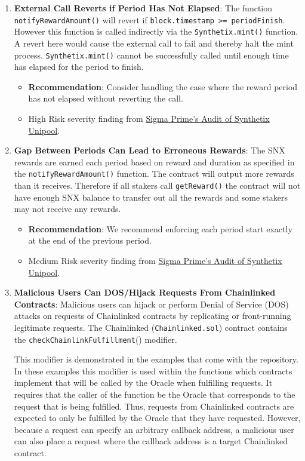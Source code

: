\begin{enumerate}
\item\textbf{External Call Reverts if Period Has Not Elapsed}: The function \verb|notifyRewardAmount()| will revert if \verb|block.timestamp >= periodFinish|. However this function is called indirectly via the \verb|Synthetix.mint()| function. A revert here would cause the external call to fail and thereby halt the mint process. \verb|Synthetix.mint()| cannot be successfully called until enough time has elapsed for the period to finish.
	\begin{itemize}
	\item\textbf{Recommendation}: Consider handling the case where the reward period has not elapsed without reverting the call.
	\item High Risk severity finding from \href{https://github.com/sigp/public-audits/blob/master/synthetix/unipool/review.pdf}{Sigma Prime's Audit of Synthetix Unipool}.
	\end{itemize}

\item\textbf{Gap Between Periods Can Lead to Erroneous Rewards}: The SNX rewards are earned each period based on reward and duration as specified in the \verb|notifyRewardAmount()| function. The contract will output more rewards than it receives. Therefore if all stakers call \verb|getReward()| the contract will not have enough SNX balance to transfer out all the rewards and some stakers may not receive any rewards.
	\begin{itemize}
	\item\textbf{Recommendation}: We recommend enforcing each period start exactly at the end of the previous period.
	\item Medium Risk severity finding from \href{https://github.com/sigp/public-audits/blob/master/synthetix/unipool/review.pdf}{Sigma Prime's Audit of Synthetix Unipool}.
	\end{itemize}

\item\textbf{Malicious Users Can DOS/Hijack Requests From Chainlinked Contracts}: Malicious users can hijack or perform Denial of Service (DOS) attacks on requests of Chainlinked contracts by replicating or front-running legitimate requests. The Chainlinked (\verb|Chainlinked.sol|) contract contains the \verb|checkChainlinkFulfillment|() modifier.

This modifier is demonstrated in the examples that come with the repository. In these examples this modifier is used within the functions which contracts implement that will be called by the Oracle when fulfilling requests. It requires that the caller of the function be the Oracle that corresponds to the request that is being fulfilled. Thus, requests from Chainlinked contracts are expected to only be fulfilled by the Oracle that they have requested. However, because a request can specify an arbitrary callback address, a malicious user can also place a request where the callback address is a target Chainlinked contract.


\end{enumerate}
